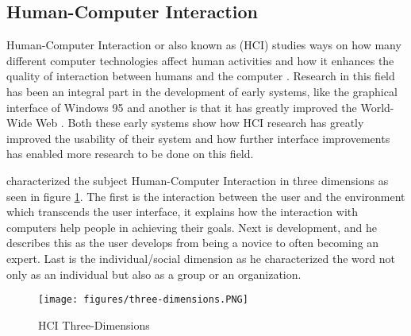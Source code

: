 
%

\subsection{Human-Computer Interaction}
Human-Computer Interaction or also known as (HCI) studies ways on how many different computer technologies affect human activities \cite{dix2009human} and how it enhances the quality of interaction between humans and the computer \cite{baecker2014readings}. Research in this field has been an integral part in the development of early systems, like the graphical interface of Windows 95 and another is that it has greatly improved the World-Wide Web \cite{myers1998brief}. Both these early systems show how HCI research has greatly improved the usability of their system and how further interface improvements has enabled more research to be done on this field. 

\citeauthor{kaptelinin1996activity} characterized the subject Human-Computer Interaction in three dimensions as seen in figure \ref{fig:three_dimensions}. The first is the interaction between the user and the environment which transcends the user interface, it explains how the interaction with computers help people in achieving their goals. Next is development, and he describes this as the user develops from being a novice to often becoming an expert. Last is the individual/social dimension as he characterized the word  not only as an individual but also as a group or an organization.

\begin{figure}[H]
    \centering
    \texttt{[image: figures/three-dimensions.PNG]}
    \caption{HCI Three-Dimensions \protect\cite{kaptelinin1996activity}}
    \label{fig:three_dimensions}
\end{figure}

